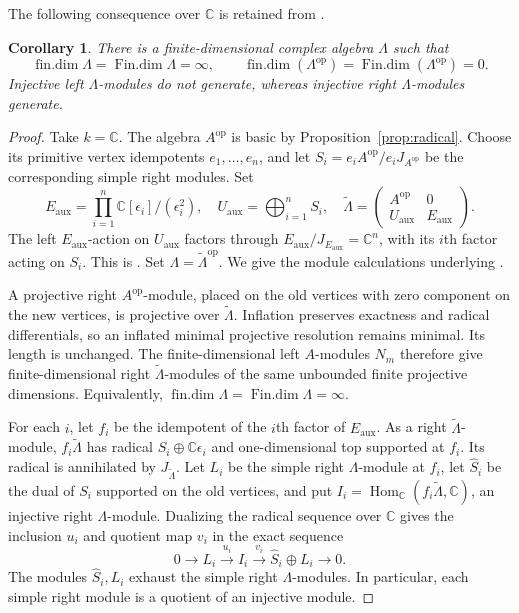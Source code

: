 \documentclass[11pt]{article}
\numberwithin{equation}{section}
\newtheorem{corollary}[theorem]{Corollary}
\theoremstyle{definition}
\theoremstyle{remark}
\newcommand{\C}{\mathbb C}
\DeclareMathOperator{\Hom}{Hom}
\DeclareMathOperator{\findim}{fin.dim}
\DeclareMathOperator{\Findim}{Fin.dim}
\begin{document}
The following consequence over $\C$ is retained from \cite{OpenAI198}.
\begin{corollary}
There is a finite-dimensional complex algebra $\Lambda$ such that
\[
\findim\Lambda=\Findim\Lambda=\infty,\qquad
\findim(\Lambda^{\mathrm{op}})=\Findim(\Lambda^{\mathrm{op}})=0.
\]
Injective left $\Lambda$-modules do not generate, whereas injective
right $\Lambda$-modules generate.
\end{corollary}
\begin{proof}
Take $k=\C$. The algebra $A^{\mathrm{op}}$ is basic by
Proposition~\ref{prop:radical}. Choose its primitive vertex
idempotents $e_1,\ldots,e_n$, and let
$S_i=e_iA^{\mathrm{op}}/e_iJ_{A^{\mathrm{op}}}$ be the corresponding
simple right modules. Set
\[
E_{\mathrm{aux}}=\prod_{i=1}^n\C[\epsilon_i]/(\epsilon_i^2),
\quad U_{\mathrm{aux}}=\bigoplus_{i=1}^n S_i,
\quad \widetilde\Lambda=
\begin{pmatrix}A^{\mathrm{op}}&0\\U_{\mathrm{aux}}&E_{\mathrm{aux}}\end{pmatrix}.
\]
The left $E_{\mathrm{aux}}$-action on $U_{\mathrm{aux}}$ factors
through $E_{\mathrm{aux}}/J_{E_{\mathrm{aux}}}=\C^n$, with its $i$th
factor acting on $S_i$. This is \cite[Construction~2.1]{Cummings2024}.
Set $\Lambda=\widetilde\Lambda^{\mathrm{op}}$. We give the module
calculations underlying \cite[Propositions~3.2--3.3 and 4.4]{Cummings2024}.

A projective right $A^{\mathrm{op}}$-module, placed on the old
vertices with zero component on the new vertices, is projective over
$\widetilde\Lambda$. Inflation preserves exactness and radical
differentials, so an inflated minimal projective resolution remains
minimal. Its length is unchanged. The finite-dimensional left
$A$-modules $N_m$ therefore give finite-dimensional right
$\widetilde\Lambda$-modules of the same unbounded finite projective
dimensions. Equivalently, $\findim\Lambda=\Findim\Lambda=\infty$.

For each $i$, let $f_i$ be the idempotent of the $i$th factor of
$E_{\mathrm{aux}}$. As a right $\widetilde\Lambda$-module,
$f_i\widetilde\Lambda$ has radical $S_i\oplus\C\epsilon_i$
and one-dimensional top supported at $f_i$. Its radical is
annihilated by $J_{\widetilde\Lambda}$. Let $L_i$ be the simple right
$\Lambda$-module at $f_i$, let $\widehat S_i$ be the dual of $S_i$
supported on the old vertices, and put
$I_i=\Hom_{\C}(f_i\widetilde\Lambda,\C)$, an injective right
$\Lambda$-module. Dualizing the radical sequence over $\C$ gives
the inclusion $u_i$ and quotient map $v_i$ in the exact sequence
\[
 0\longrightarrow L_i\xrightarrow{u_i}I_i
 \xrightarrow{v_i}\widehat S_i\oplus L_i\longrightarrow0.
\]
The modules $\widehat S_i,L_i$ exhaust the simple right
$\Lambda$-modules. In particular, each simple right module is a
quotient of an injective module.


\end{proof}
\end{document}
